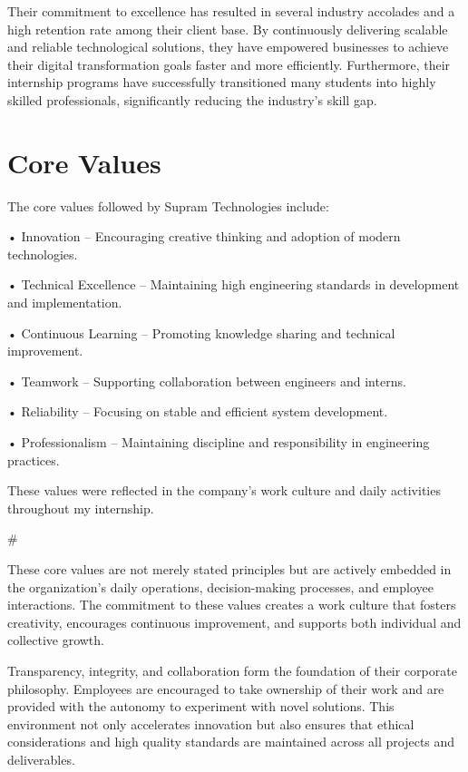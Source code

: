 \documentclass[12pt,a4paper]{report}
\begin{document}
Their commitment to excellence has resulted in several industry accolades and a high retention rate among their client base. By continuously delivering scalable and reliable technological solutions, they have empowered businesses to achieve their digital transformation goals faster and more efficiently. Furthermore, their internship programs have successfully transitioned many students into highly skilled professionals, significantly reducing the industry's skill gap.


\section{Core Values}

The core values followed by Supram Technologies include:


• Innovation – Encouraging creative thinking and adoption of modern technologies.


• Technical Excellence – Maintaining high engineering standards in development and implementation.


• Continuous Learning – Promoting knowledge sharing and technical improvement.


• Teamwork – Supporting collaboration between engineers and interns.


• Reliability – Focusing on stable and efficient system development.


• Professionalism – Maintaining discipline and responsibility in engineering practices.


These values were reflected in the company’s work culture and daily activities throughout my internship.


\#


These core values are not merely stated principles but are actively embedded in the organization's daily operations, decision-making processes, and employee interactions. The commitment to these values creates a work culture that fosters creativity, encourages continuous improvement, and supports both individual and collective growth.


Transparency, integrity, and collaboration form the foundation of their corporate philosophy. Employees are encouraged to take ownership of their work and are provided with the autonomy to experiment with novel solutions. This environment not only accelerates innovation but also ensures that ethical considerations and high quality standards are maintained across all projects and deliverables.
\end{document}
